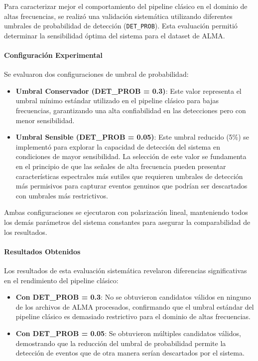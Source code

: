 Para caracterizar mejor el comportamiento del pipeline clásico en el dominio de altas frecuencias, se realizó una validación sistemática utilizando diferentes umbrales de probabilidad de detección (\texttt{DET\_PROB}). Esta evaluación permitió determinar la sensibilidad óptima del sistema para el dataset de ALMA.

\paragraph{Configuración Experimental}

Se evaluaron dos configuraciones de umbral de probabilidad:

\begin{itemize}
    \item \textbf{Umbral Conservador (DET\_PROB = 0.3)}: Este valor representa el umbral mínimo estándar utilizado en el pipeline clásico para bajas frecuencias, garantizando una alta confiabilidad en las detecciones pero con menor sensibilidad.
    \item \textbf{Umbral Sensible (DET\_PROB = 0.05)}: Este umbral reducido (5\%) se implementó para explorar la capacidad de detección del sistema en condiciones de mayor sensibilidad. La selección de este valor se fundamenta en el principio de que las señales de alta frecuencia pueden presentar características espectrales más sutiles que requieren umbrales de detección más permisivos para capturar eventos genuinos que podrían ser descartados con umbrales más restrictivos.
\end{itemize}

Ambas configuraciones se ejecutaron con polarización lineal, manteniendo todos los demás parámetros del sistema constantes para asegurar la comparabilidad de los resultados.

\paragraph{Resultados Obtenidos}

Los resultados de esta evaluación sistemática revelaron diferencias significativas en el rendimiento del pipeline clásico:

\begin{itemize}
    \item \textbf{Con DET\_PROB = 0.3}: No se obtuvieron candidatos válidos en ninguno de los archivos de ALMA procesados, confirmando que el umbral estándar del pipeline clásico es demasiado restrictivo para el dominio de altas frecuencias.
    \item \textbf{Con DET\_PROB = 0.05}: Se obtuvieron múltiples candidatos válidos, demostrando que la reducción del umbral de probabilidad permite la detección de eventos que de otra manera serían descartados por el sistema.
\end{itemize}

